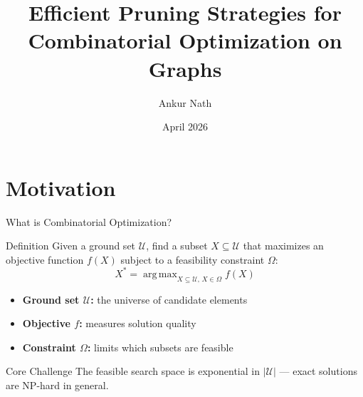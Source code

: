 \documentclass[aspectratio=169,xcolor=dvipsnames,8pt]{beamer}
\title[Efficient Pruning for Graph CO]{Efficient Pruning Strategies for\\Combinatorial Optimization on Graphs}
\author[A. Nath]{Ankur Nath}
\institute[TAMU]{%
  Department of Computer Science\\
  Texas A\&M University\\
  \vspace{0.3cm}
  {\small Committee: Dr.\ Alan Kuhnle (Chair), Dr.\ Yoonsuck Choe,
  Dr.\ James Caverlee, Dr.\ Abhishek Chakrabortty}
}
\date{April 2026}
\DeclareMathOperator*{\argmax}{arg\,max}
\begin{document}
\begin{frame}[plain]
  \titlepage
\end{frame}

\section{Motivation}

\begin{frame}{What is Combinatorial Optimization?}
  \begin{block}{Definition}
    Given a ground set $\mathcal{U}$, find a subset $X \subseteq \mathcal{U}$ that maximizes an objective function $f(X)$ subject to a feasibility constraint $\Omega$:
    \[
      X^* = \argmax_{X \subseteq \mathcal{U},\, X \in \Omega} f(X)
    \]
  \end{block}

  \vspace{0.2cm}

  \begin{itemize}
    \item \textbf{Ground set $\mathcal{U}$:} the universe of candidate elements 
    \item \textbf{Objective $f$:} measures solution quality 
    \item \textbf{Constraint $\Omega$:} limits which subsets are feasible 
  \end{itemize}

  \vspace{0.2cm}

  \begin{alertblock}{Core Challenge}
    The feasible search space is exponential in $|\mathcal{U}|$ --- exact solutions are NP-hard in general.
  \end{alertblock}
\end{frame}
\end{document}
